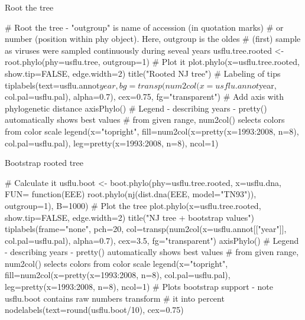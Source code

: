 \documentclass[compress, xelatex, 11pt, xcolor=svgnames, aspectratio=169, url={hyphens, lowtilde}]{beamer}
\begin{document}
\begin{frame}[fragile]{Root the tree}
	\begin{spluscode}
    # Root the tree - "outgroup" is name of accession (in quotation marks)
    # or number (position within phy object). Here, outgroup is the oldes
    # (first) sample as viruses were sampled continuously during seveal years
    usflu.tree.rooted <- root.phylo(phy=usflu.tree, outgroup=1)
    # Plot it
    plot.phylo(x=usflu.tree.rooted, show.tip=FALSE, edge.width=2)
    title("Rooted NJ tree")
    # Labeling of tips
    tiplabels(text=usflu.annot$year, bg=transp(num2col(x=usflu.annot$year,
      col.pal=usflu.pal), alpha=0.7), cex=0.75, fg="transparent")
    # Add axis with phylogenetic distance
    axisPhylo()
    # Legend - describing years - pretty() automatically shows best values
    # from given range, num2col() selects colors from color scale
    legend(x="topright", fill=num2col(x=pretty(x=1993:2008, n=8),
      col.pal=usflu.pal), leg=pretty(x=1993:2008, n=8), ncol=1)
	\end{spluscode}
\end{frame}

\begin{frame}[fragile]{Bootstrap rooted tree}
	\begin{spluscode}
    # Calculate it
    usflu.boot <- boot.phylo(phy=usflu.tree.rooted, x=usflu.dna, FUN=
      function(EEE) root.phylo(nj(dist.dna(EEE, model="TN93")), outgroup=1),
      B=1000)
    # Plot the tree
    plot.phylo(x=usflu.tree.rooted, show.tip=FALSE, edge.width=2)
    title("NJ tree + bootstrap values")
    tiplabels(frame="none", pch=20, col=transp(num2col(x=usflu.annot[["year"]],
      col.pal=usflu.pal), alpha=0.7), cex=3.5, fg="transparent")
    axisPhylo()
    # Legend - describing years - pretty() automatically shows best values
    # from given range, num2col() selects colors from color scale
    legend(x="topright", fill=num2col(x=pretty(x=1993:2008, n=8),
      col.pal=usflu.pal), leg=pretty(x=1993:2008, n=8), ncol=1)
    # Plots bootstrap support - note usflu.boot contains raw numbers transform
    # it into percent
    nodelabels(text=round(usflu.boot/10), cex=0.75)
	\end{spluscode}
\end{frame}
\end{document}
